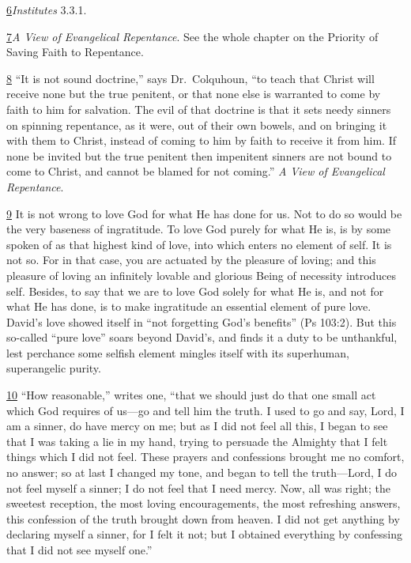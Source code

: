 \documentclass[
]{book}
\begin{document}
\protect\hyperlink{sdfootnote6anc}{6}\emph{Institutes} 3.3.1.

\protect\hyperlink{sdfootnote7anc}{7}\emph{A View of Evangelical Repentance}. See the whole chapter on the Priority of Saving Faith to Repentance.

\protect\hyperlink{sdfootnote8anc}{8} ``It is not sound doctrine,'' says Dr.~Colquhoun, ``to teach that Christ will receive none but the true penitent, or that none else is warranted to come by faith to him for salvation. The evil of that doctrine is that it sets needy sinners on spinning repentance, as it were, out of their own bowels, and on bringing it with them to Christ, instead of coming to him by faith to receive it from him. If none be invited but the true penitent then impenitent sinners are not bound to come to Christ, and cannot be blamed for not coming.'' \emph{A View of Evangelical Repentance}.

\protect\hyperlink{sdfootnote9anc}{9} It is not wrong to love God for what He has done for us. Not to do so would be the very baseness of ingratitude. To love God purely for what He is, is by some spoken of as that highest kind of love, into which enters no element of self. It is not so. For in that case, you are actuated by the pleasure of loving; and this pleasure of loving an infinitely lovable and glorious Being of necessity introduces self. Besides, to say that we are to love God solely for what He is, and not for what He has done, is to make ingratitude an essential element of pure love. David's love showed itself in ``not forgetting God's benefits'' (Ps 103:2). But this so-called ``pure love'' soars beyond David's, and finds it a duty to be unthankful, lest perchance some selfish element mingles itself with its superhuman, superangelic purity.

\protect\hyperlink{sdfootnote10anc}{10} ``How reasonable,'' writes one, ``that we should just do that one small act which God requires of us---go and tell him the truth. I used to go and say, Lord, I am a sinner, do have mercy on me; but as I did not feel all this, I began to see that I was taking a lie in my hand, trying to persuade the Almighty that I felt things which I did not feel. These prayers and confessions brought me no comfort, no answer; so at last I changed my tone, and began to tell the truth---Lord, I do not feel myself a sinner; I do not feel that I need mercy. Now, all was right; the sweetest reception, the most loving encouragements, the most refreshing answers, this confession of the truth brought down from heaven. I did not get anything by declaring myself a sinner, for I felt it not; but I obtained everything by confessing that I did not see myself one.''
\end{document}

